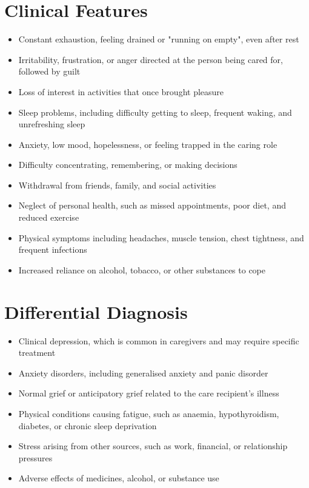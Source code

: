 \section*{Clinical Features}
\begin{itemize}
    \item Constant exhaustion, feeling drained or "running on empty", even after rest
    \item Irritability, frustration, or anger directed at the person being cared for, followed by guilt
    \item Loss of interest in activities that once brought pleasure
    \item Sleep problems, including difficulty getting to sleep, frequent waking, and unrefreshing sleep
    \item Anxiety, low mood, hopelessness, or feeling trapped in the caring role
    \item Difficulty concentrating, remembering, or making decisions
    \item Withdrawal from friends, family, and social activities
    \item Neglect of personal health, such as missed appointments, poor diet, and reduced exercise
    \item Physical symptoms including headaches, muscle tension, chest tightness, and frequent infections
    \item Increased reliance on alcohol, tobacco, or other substances to cope
\end{itemize}

\section*{Differential Diagnosis}
\begin{itemize}
    \item Clinical depression, which is common in caregivers and may require specific treatment
    \item Anxiety disorders, including generalised anxiety and panic disorder
    \item Normal grief or anticipatory grief related to the care recipient's illness
    \item Physical conditions causing fatigue, such as anaemia, hypothyroidism, diabetes, or chronic sleep deprivation
    \item Stress arising from other sources, such as work, financial, or relationship pressures
    \item Adverse effects of medicines, alcohol, or substance use
\end{itemize}

